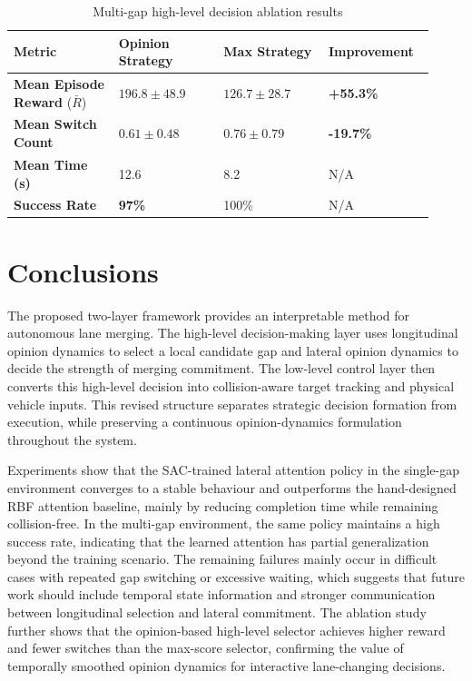 \begin{table}[!htbp]
\centering
\caption{Multi-gap high-level decision ablation results}
\label{tab:multi-gap-ablation}
\footnotesize
\begin{tabular}{p{0.23\linewidth}p{0.23\linewidth}p{0.23\linewidth}p{0.23\linewidth}}
\toprule
Metric & Opinion Strategy & Max Strategy & Improvement \\
\midrule
\textbf{Mean Episode Reward} (\(\bar{R}\)) & $196.8 \pm 48.9$ & $126.7 \pm 28.7$ & \textbf{+55.3\%} \\
\textbf{Mean Switch Count} & $0.61 \pm 0.48$ & $0.76 \pm 0.79$ & \textbf{-19.7\%} \\
\textbf{Mean Time (s)} & 12.6 & 8.2 & N/A\\
\textbf{Success Rate} & \textbf{97\%} & 100\% & N/A\\
\bottomrule
\end{tabular}
\end{table}



\section{Conclusions}

The proposed two-layer framework provides an interpretable method for autonomous lane merging. The high-level decision-making layer uses longitudinal opinion dynamics to select a local candidate gap and lateral opinion dynamics to decide the strength of merging commitment. The low-level control layer then converts this high-level decision into collision-aware target tracking and physical vehicle inputs. This revised structure separates strategic decision formation from execution, while preserving a continuous opinion-dynamics formulation throughout the system.

Experiments show that the SAC-trained lateral attention policy in the single-gap environment converges to a stable behaviour and outperforms the hand-designed RBF attention baseline, mainly by reducing completion time while remaining collision-free. In the multi-gap environment, the same policy maintains a high success rate, indicating that the learned attention has partial generalization beyond the training scenario. The remaining failures mainly occur in difficult cases with repeated gap switching or excessive waiting, which suggests that future work should include temporal state information and stronger communication between longitudinal selection and lateral commitment. The ablation study further shows that the opinion-based high-level selector achieves higher reward and fewer switches than the max-score selector, confirming the value of temporally smoothed opinion dynamics for interactive lane-changing decisions.

